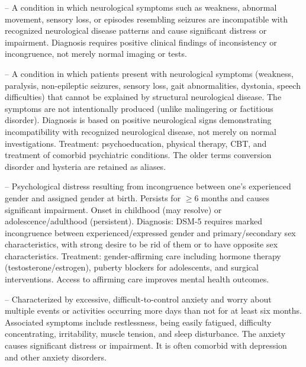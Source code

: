 -- A condition in which neurological symptoms such as weakness, abnormal movement, sensory loss, or episodes resembling seizures are incompatible with recognized neurological disease patterns and cause significant distress or impairment. Diagnosis requires positive clinical findings of inconsistency or incongruence, not merely normal imaging or tests.

-- A condition in which patients present with neurological symptoms (weakness, paralysis, non-epileptic seizures, sensory loss, gait abnormalities, dystonia, speech difficulties) that cannot be explained by structural neurological disease. The symptoms are not intentionally produced (unlike malingering or factitious disorder). Diagnosis is based on positive neurological signs demonstrating incompatibility with recognized neurological disease, not merely on normal investigations. Treatment: psychoeducation, physical therapy, CBT, and treatment of comorbid psychiatric conditions. The older terms conversion disorder and hysteria are retained as aliases.

-- Psychological distress resulting from incongruence between one's experienced gender and assigned gender at birth. Persists for \(\ge\)6 months and causes significant impairment. Onset in childhood (may resolve) or adolescence/adulthood (persistent). Diagnosis: DSM-5 requires marked incongruence between experienced/expressed gender and primary/secondary sex characteristics, with strong desire to be rid of them or to have opposite sex characteristics. Treatment: gender-affirming care including hormone therapy (testosterone/estrogen), puberty blockers for adolescents, and surgical interventions. Access to affirming care improves mental health outcomes.

-- Characterized by excessive, difficult-to-control anxiety and worry about multiple events or activities occurring more days than not for at least six months. Associated symptoms include restlessness, being easily fatigued, difficulty concentrating, irritability, muscle tension, and sleep disturbance. The anxiety causes significant distress or impairment. It is often comorbid with depression and other anxiety disorders.


